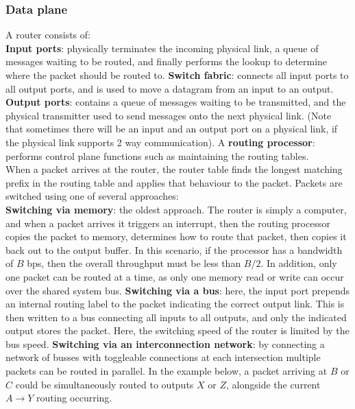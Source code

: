\subsubsection{Data plane}
A router consists of:\\
\textbf{Input ports}: physically terminates the incoming physical link, a queue of messages waiting to be routed, and finally performs the lookup to determine where the packet should be routed to.
\textbf{Switch fabric}: connects all input ports to all output ports, and is used to move a datagram from an input to an output.
\textbf{Output ports}: contains a queue of messages waiting to be transmitted, and the physical transmitter used to send messages onto the next physical link. (Note that sometimes there will be an input and an output port on a physical link, if the physical link supports 2 way communication).
A \textbf{routing processor}: performs control plane functions such as maintaining the routing tables.\\
When a packet arrives at the router, the router table finds the longest matching prefix in the routing table and applies that behaviour to the packet. Packets are switched using one of several approaches:\\
\textbf{Switching via memory}: the oldest approach. The router is simply a computer, and when a packet arrives it triggers an interrupt, then the routing processor copies the packet to memory, determines how to route that packet, then copies it back out to the output buffer. In this scenario, if the processor has a bandwidth of $B$ bps, then the overall throughput must be less than $B/2$. In addition, only one packet can be routed at a time, as only one memory read or write can occur over the shared system bus. \textbf{Switching via a bus}: here, the input port prepends an internal routing label to the packet indicating the correct output link. This is then written to a bus connecting all inputs to all outputs, and only the indicated output stores the packet. Here, the switching speed of the router is limited by the bus speed. \textbf{Switching via an interconnection network}: by connecting a network of busses with toggleable connections at each intersection multiple packets can be routed in parallel. In the example below, a packet arriving at $B$ or $C$ could be simultaneously routed to outputs $X$ or $Z$, alongside the current $A\rightarrow Y$ routing occurring.\\

